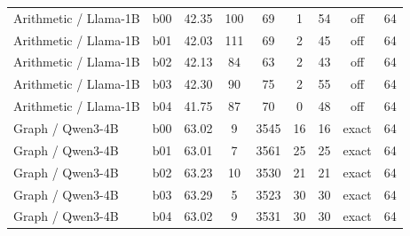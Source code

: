 \begin{table}[H]
\begin{tabular}{@{}llccccccc@{}}
Arithmetic / Llama-1B & b00 & 42.35 & 100 & 69 & 1 & 54 & off & 64\\
Arithmetic / Llama-1B & b01 & 42.03 & 111 & 69 & 2 & 45 & off & 64\\
Arithmetic / Llama-1B & b02 & 42.13 & 84 & 63 & 2 & 43 & off & 64\\
Arithmetic / Llama-1B & b03 & 42.30 & 90 & 75 & 2 & 55 & off & 64\\
Arithmetic / Llama-1B & b04 & 41.75 & 87 & 70 & 0 & 48 & off & 64\\
\addlinespace
Graph / Qwen3-4B & b00 & 63.02 & 9 & 3545 & 16 & 16 & exact & 64\\
Graph / Qwen3-4B & b01 & 63.01 & 7 & 3561 & 25 & 25 & exact & 64\\
Graph / Qwen3-4B & b02 & 63.23 & 10 & 3530 & 21 & 21 & exact & 64\\
Graph / Qwen3-4B & b03 & 63.29 & 5 & 3523 & 30 & 30 & exact & 64\\
Graph / Qwen3-4B & b04 & 63.02 & 9 & 3531 & 30 & 30 & exact & 64\\
\bottomrule
\end{tabular}
\end{table}
